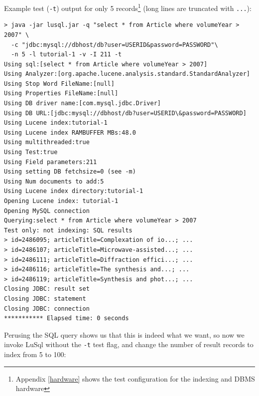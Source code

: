 Example test ({\tt -t}) output for only 5 records\footnote{Appendix
  \ref{hardware} shows the test configuration for the indexing and DBMS
  hardware} (long lines are truncated with {\tt ...}):
{\small
\begin{lstlisting}[backgroundcolor=\color{grey}]
> java -jar lusql.jar -q "select * from Article where volumeYear > 2007" \
  -c "jdbc:mysql://dbhost/db?user=USERID&password=PASSWORD"\
  -n 5 -l tutorial-1 -v -I 211 -t
Using sql:[select * from Article where volumeYear > 2007]
Using Analyzer:[org.apache.lucene.analysis.standard.StandardAnalyzer]
Using Stop Word FileName:[null]
Using Properties FileName:[null]                                                            
Using DB driver name:[com.mysql.jdbc.Driver]
Using DB URL:[jdbc:mysql://dbhost/db?user=USERID\&password=PASSWORD]
Using Lucene index:tutorial-1
Using Lucene index RAMBUFFER MBs:48.0 
Using multithreaded:true  
Using Test:true 
Using Field parameters:211
Using setting DB fetchsize=0 (see -m)
Using Num documents to add:5 
Using Lucene index directory:tutorial-1   
Opening Lucene index: tutorial-1
Opening MySQL connection 
Querying:select * from Article where volumeYear > 2007 
Test only: not indexing: SQL results  
> id=2486095; articleTitle=Complexation of io...; ...
> id=2486107; articleTitle=Microwave-assisted...; ...
> id=2486111; articleTitle=Diffraction effici...; ...
> id=2486116; articleTitle=The synthesis and...; ...
> id=2486119; articleTitle=Synthesis and phot...; ...
Closing JDBC: result set
Closing JDBC: statement
Closing JDBC: connection
*********** Elapsed time: 0 seconds 
\end{lstlisting}
}
\noindent Perusing the SQL query shows us that this is indeed what we want, so now we
invoke LuSql without the {\tt -t} test flag, and change the number of result
records to index from 5 to 100:
